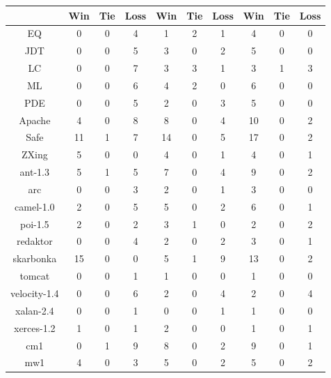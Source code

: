 \begin{table}[!t]
\begin{tabular}{|@{}c@{}||@{}c@{}|@{}c@{}|@{}c@{}||@{}c@{}|@{}c@{}|@{}c@{}||@{}c@{}|@{}c@{}|@{}c@{}|}
& Win & Tie & Loss & Win & Tie & Loss & Win & Tie & Loss \\ \hline \hline
EQ  &0      &0      &4      &1      &2      &1      &4      &0      &0\\ \hline
JDT &0      &0      &5      &3      &0      &2      &5      &0      &0\\ \hline
LC  &0      &0      &7      &3      &3      &1      &3      &1      &3\\ \hline
ML  &0      &0      &6      &4      &2      &0      &6      &0      &0\\ \hline
PDE &0      &0      &5      &2      &0      &3      &5      &0      &0\\ \hline
Apache      &4      &0      &8      &8      &0      &4      &10     &0      &2\\ \hline
Safe        &11     &1      &7      &14     &0      &5      &17     &0      &2\\ \hline
ZXing       &5      &0      &0      &4      &0      &1      &4      &0      &1\\ \hline
ant-1.3     &5      &1      &5      &7      &0      &4      &9      &0      &2\\ \hline
arc &0      &0      &3      &2      &0      &1      &3      &0      &0\\ \hline
camel-1.0   &2      &0      &5      &5      &0      &2      &6      &0      &1\\ \hline
poi-1.5     &2      &0      &2      &3      &1      &0      &2      &0      &2\\ \hline
redaktor    &0      &0      &4      &2      &0      &2      &3      &0      &1\\ \hline
skarbonka   &15     &0      &0      &5      &1      &9      &13     &0      &2\\ \hline
tomcat      &0      &0      &1      &1      &0      &0      &1      &0      &0\\ \hline
velocity-1.4        &0      &0      &6      &2      &0      &4      &2      &0      &4\\ \hline
xalan-2.4   &0      &0      &1      &0      &0      &1      &1      &0      &0\\ \hline
xerces-1.2  &1      &0      &1      &2      &0      &0      &1      &0      &1\\ \hline
cm1 &0      &1      &9      &8      &0      &2      &9      &0      &1\\ \hline
mw1 &4      &0      &3      &5      &0      &2      &5      &0      &2\\ \hline

\end{tabular}
\end{table}
